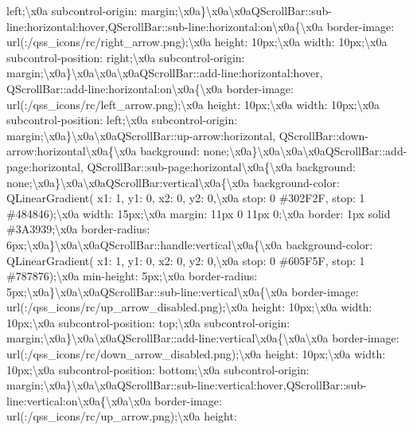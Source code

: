 \begin{DoxyCompactItemize}
left;\textbackslash{}x0a subcontrol-\/origin\+: margin;\textbackslash{}x0a\}\textbackslash{}x0a\textbackslash{}x0a\+Q\+Scroll\+Bar\+::sub-\/line\+:horizontal\+:hover,\+Q\+Scroll\+Bar\+::sub-\/line\+:horizontal\+:on\textbackslash{}x0a\{\textbackslash{}x0a border-\/image\+: url(\+:/qss\+\_\+icons/rc/right\+\_\+arrow.\+png);\textbackslash{}x0a height\+: 10px;\textbackslash{}x0a width\+: 10px;\textbackslash{}x0a subcontrol-\/position\+: right;\textbackslash{}x0a subcontrol-\/origin\+: margin;\textbackslash{}x0a\}\textbackslash{}x0a\textbackslash{}x0a\textbackslash{}x0a\+Q\+Scroll\+Bar\+::add-\/line\+:horizontal\+:hover, Q\+Scroll\+Bar\+::add-\/line\+:horizontal\+:on\textbackslash{}x0a\{\textbackslash{}x0a border-\/image\+: url(\+:/qss\+\_\+icons/rc/left\+\_\+arrow.\+png);\textbackslash{}x0a height\+: 10px;\textbackslash{}x0a width\+: 10px;\textbackslash{}x0a subcontrol-\/position\+: left;\textbackslash{}x0a subcontrol-\/origin\+: margin;\textbackslash{}x0a\}\textbackslash{}x0a\textbackslash{}x0a\+Q\+Scroll\+Bar\+::up-\/arrow\+:horizontal, Q\+Scroll\+Bar\+::down-\/arrow\+:horizontal\textbackslash{}x0a\{\textbackslash{}x0a background\+: none;\textbackslash{}x0a\}\textbackslash{}x0a\textbackslash{}x0a\textbackslash{}x0a\+Q\+Scroll\+Bar\+::add-\/page\+:horizontal, Q\+Scroll\+Bar\+::sub-\/page\+:horizontal\textbackslash{}x0a\{\textbackslash{}x0a background\+: none;\textbackslash{}x0a\}\textbackslash{}x0a\textbackslash{}x0a\+Q\+Scroll\+Bar\+:vertical\textbackslash{}x0a\{\textbackslash{}x0a background-\/color\+: Q\+Linear\+Gradient( x1\+: 1, y1\+: 0, x2\+: 0, y2\+: 0,\textbackslash{}x0a stop\+: 0 \#302\+F2\+F, stop\+: 1 \#484846);\textbackslash{}x0a width\+: 15px;\textbackslash{}x0a margin\+: 11px 0 11px 0;\textbackslash{}x0a border\+: 1px solid \#3\+A3939;\textbackslash{}x0a border-\/radius\+: 6px;\textbackslash{}x0a\}\textbackslash{}x0a\textbackslash{}x0a\+Q\+Scroll\+Bar\+::handle\+:vertical\textbackslash{}x0a\{\textbackslash{}x0a background-\/color\+: Q\+Linear\+Gradient( x1\+: 1, y1\+: 0, x2\+: 0, y2\+: 0,\textbackslash{}x0a stop\+: 0 \#605\+F5\+F, stop\+: 1 \#787876);\textbackslash{}x0a min-\/height\+: 5px;\textbackslash{}x0a border-\/radius\+: 5px;\textbackslash{}x0a\}\textbackslash{}x0a\textbackslash{}x0a\+Q\+Scroll\+Bar\+::sub-\/line\+:vertical\textbackslash{}x0a\{\textbackslash{}x0a border-\/image\+: url(\+:/qss\+\_\+icons/rc/up\+\_\+arrow\+\_\+disabled.\+png);\textbackslash{}x0a height\+: 10px;\textbackslash{}x0a width\+: 10px;\textbackslash{}x0a subcontrol-\/position\+: top;\textbackslash{}x0a subcontrol-\/origin\+: margin;\textbackslash{}x0a\}\textbackslash{}x0a\textbackslash{}x0a\+Q\+Scroll\+Bar\+::add-\/line\+:vertical\textbackslash{}x0a\{\textbackslash{}x0a\textbackslash{}x0a border-\/image\+: url(\+:/qss\+\_\+icons/rc/down\+\_\+arrow\+\_\+disabled.\+png);\textbackslash{}x0a height\+: 10px;\textbackslash{}x0a width\+: 10px;\textbackslash{}x0a subcontrol-\/position\+: bottom;\textbackslash{}x0a subcontrol-\/origin\+: margin;\textbackslash{}x0a\}\textbackslash{}x0a\textbackslash{}x0a\+Q\+Scroll\+Bar\+::sub-\/line\+:vertical\+:hover,\+Q\+Scroll\+Bar\+::sub-\/line\+:vertical\+:on\textbackslash{}x0a\{\textbackslash{}x0a\textbackslash{}x0a border-\/image\+: url(\+:/qss\+\_\+icons/rc/up\+\_\+arrow.\+png);\textbackslash{}x0a height\+: 
\end{DoxyCompactItemize}
